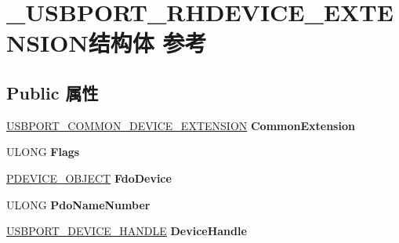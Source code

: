 \hypertarget{struct___u_s_b_p_o_r_t___r_h_d_e_v_i_c_e___e_x_t_e_n_s_i_o_n}{}\section{\+\_\+\+U\+S\+B\+P\+O\+R\+T\+\_\+\+R\+H\+D\+E\+V\+I\+C\+E\+\_\+\+E\+X\+T\+E\+N\+S\+I\+O\+N结构体 参考}
\label{struct___u_s_b_p_o_r_t___r_h_d_e_v_i_c_e___e_x_t_e_n_s_i_o_n}
\subsection*{Public 属性}
\begin{DoxyCompactItemize}
\item 
\mbox{\label{struct___u_s_b_p_o_r_t___r_h_d_e_v_i_c_e___e_x_t_e_n_s_i_o_n_a35c48dcc0a415bc06c16f5b78e0496b1}} 
\hyperlink{struct___u_s_b_p_o_r_t___c_o_m_m_o_n___d_e_v_i_c_e___e_x_t_e_n_s_i_o_n}{U\+S\+B\+P\+O\+R\+T\+\_\+\+C\+O\+M\+M\+O\+N\+\_\+\+D\+E\+V\+I\+C\+E\+\_\+\+E\+X\+T\+E\+N\+S\+I\+ON} {\bfseries Common\+Extension}
\item 
\mbox{\label{struct___u_s_b_p_o_r_t___r_h_d_e_v_i_c_e___e_x_t_e_n_s_i_o_n_aa3590d87e53b2fac1969e8163083f9a5}} 
U\+L\+O\+NG {\bfseries Flags}
\item 
\mbox{\label{struct___u_s_b_p_o_r_t___r_h_d_e_v_i_c_e___e_x_t_e_n_s_i_o_n_ad227123d3b8929af17fa1ecb2deb5972}} 
\hyperlink{struct___d_e_v_i_c_e___o_b_j_e_c_t}{P\+D\+E\+V\+I\+C\+E\+\_\+\+O\+B\+J\+E\+CT} {\bfseries Fdo\+Device}
\item 
\mbox{\label{struct___u_s_b_p_o_r_t___r_h_d_e_v_i_c_e___e_x_t_e_n_s_i_o_n_a988a146585717254c6a0459eca623097}} 
U\+L\+O\+NG {\bfseries Pdo\+Name\+Number}
\item 
\mbox{\label{struct___u_s_b_p_o_r_t___r_h_d_e_v_i_c_e___e_x_t_e_n_s_i_o_n_ade2d8c0193dab5a7904ec7afe553705e}} 
\hyperlink{struct___u_s_b_p_o_r_t___d_e_v_i_c_e___h_a_n_d_l_e}{U\+S\+B\+P\+O\+R\+T\+\_\+\+D\+E\+V\+I\+C\+E\+\_\+\+H\+A\+N\+D\+LE} {\bfseries Device\+Handle}

\end{DoxyCompactItemize}
